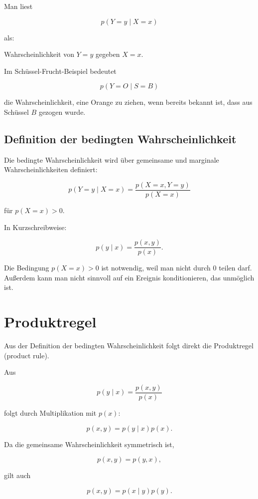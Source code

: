 Man liest

\[
    p(Y=y \mid X=x)
\]

als:

\begin{center}
Wahrscheinlichkeit von \(Y=y\) gegeben \(X=x\).
\end{center}

Im Schüssel-Frucht-Beispiel bedeutet

\[
    p(Y=O \mid S=B)
\]

die Wahrscheinlichkeit, eine Orange zu ziehen, wenn bereits bekannt ist, dass aus Schüssel \(B\) gezogen wurde.

\subsection{Definition der bedingten Wahrscheinlichkeit}

Die bedingte Wahrscheinlichkeit wird über gemeinsame und marginale Wahrscheinlichkeiten definiert:

\[
    p(Y=y \mid X=x)
    =
    \frac{p(X=x,Y=y)}{p(X=x)}
\]

für \(p(X=x) > 0\).

In Kurzschreibweise:

\[
    p(y \mid x)
    =
    \frac{p(x,y)}{p(x)}.
\]

\begin{notebox}
Die Bedingung \(p(X=x)>0\) ist notwendig, weil man nicht durch \(0\) teilen darf.
Außerdem kann man nicht sinnvoll auf ein Ereignis konditionieren, das unmöglich ist.
\end{notebox}

\section{Produktregel}

Aus der Definition der bedingten Wahrscheinlichkeit folgt direkt die Produktregel (product rule).

Aus

\[
    p(y \mid x)
    =
    \frac{p(x,y)}{p(x)}
\]

folgt durch Multiplikation mit \(p(x)\):

\[
    p(x,y)
    =
    p(y \mid x)p(x).
\]

Da die gemeinsame Wahrscheinlichkeit symmetrisch ist,

\[
    p(x,y)
    =
    p(y,x),
\]

gilt auch

\[
    p(x,y)
    =
    p(x \mid y)p(y).
\]

